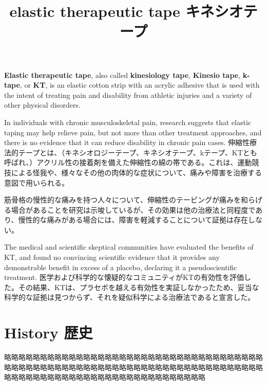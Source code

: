 \documentclass[uplatex,dvipdfmx]{jsarticle} \usepackage{amsmath,amssymb,bm}
\title{elastic therapeutic tape キネシオテープ} \author{} \date{}
\begin{document}
\maketitle
\begin{paracol}{2}
{\bf Elastic therapeutic tape}, also called {\bf kinesiology tape}, {\bf Kinesio tape}, {\bf k-tape}, or {\bf KT}, is an elastic cotton strip with an acrylic adhesive that is used with the intent of treating pain and disability from athletic injuries and a variety of other physical disorders.

In individuals with chronic musculoskeletal pain, research suggests that elastic taping may help relieve pain, but not more than other treatment approaches, and there is no evidence that it can reduce disability in chronic pain cases.
\switchcolumn
伸縮性療法的テープとは、（キネシオロジーテープ、キネシオテープ、kテープ、KTとも呼ばれ、）アクリル性の接着剤を備えた伸縮性の綿の帯である。これは、運動競技による怪我や、様々なその他の肉体的な症状について、痛みや障害を治療する意図で用いられる。

筋骨格の慢性的な痛みを持つ人々について、伸縮性のテーピングが痛みを和らげる場合があることを研究は示唆しているが、その効果は他の治療法と同程度であり、慢性的な痛みがある場合には、障害を軽減することについて証拠は存在しない。
\end{paracol}
\vspace{\baselineskip}
\begin{paracol}{2}
The medical and scientific skeptical communities have evaluated the benefits of KT, and found no convincing scientific evidence that it provides any demonstrable benefit in excess of a placebo, declaring it a pseudoscientific treatment.
\switchcolumn
医学および科学的な懐疑的なコミュニティがKTの有効性を評価した。その結果、KTは、プラセボを越える有効性を実証しなかったため、妥当な科学的な証拠は見つからず、それを疑似科学による治療法であると宣言した。
\end{paracol}
\section*{History 歴史}
略略略略略略略略略略略略略略略略略略略略略略略略略略略略略略略略略略略略略略略略略略略略略略略略略略略略略略略略略略略略略略略略略略略略略略略略略略略略略略略略略略略略略略略略略略略略略略略略略略略略





\vspace{\baselineskip}
\begin{paracol}{2}
\switchcolumn
\end{paracol}
\end{document}
